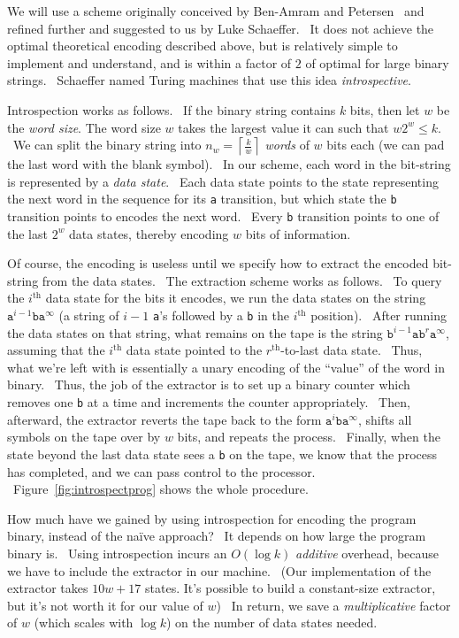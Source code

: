 \documentclass[11pt]{article}
\begin{document}
We will use a scheme originally conceived by Ben-Amram and Petersen~\cite{benamram} and refined further and suggested to us by Luke Schaeffer. \ It does not achieve the optimal theoretical encoding described above, but is relatively simple to implement and understand, and is within a factor of $2$ of optimal for large binary strings. \ Schaeffer named Turing machines that use this idea \emph{introspective}.

Introspection works as follows. \ If the binary string contains $k$ bits, then let $w$ be the \emph{word size}. The word size $w$ takes the largest value it can such that $w2^w \le k$. \ We can split the binary string into $n_w = \left \lceil{\frac{k}{w}}\right \rceil$ \emph{words} of $w$ bits each (we can pad the last word with the blank symbol). \ In our scheme, each word in the bit-string is represented by a \emph{data state}. \ Each data state points to the state representing the next word in the sequence for its \texttt{a} transition, but which state the \texttt{b} transition points to encodes the next word. \ Every \texttt{b} transition points to one of the last $2^w$ data states, thereby encoding $w$ bits of information.

Of course, the encoding is useless until we specify how to extract the encoded bit-string from the data states. \ The extraction scheme works as follows. \ To query the $i^\textrm{th}$ data state for the bits it encodes, we run the data states on the string $\texttt{a}^{i-1}\texttt{b}\texttt{a}^{\infty}$ (a string of $i-1$ \texttt{a}'s followed by a \texttt{b} in the $i^\textrm{th}$ position). \ After running the data states on that string, what remains on the tape is the string $\texttt{b}^{i-1}\texttt{a}\texttt{b}^r\texttt{a}^{\infty}$, assuming that the $i^\textrm{th}$ data state pointed to the $r^\textrm{th}$-to-last data state. \ Thus, what we're left with is essentially a unary encoding of the ``value'' of the word in binary. \ Thus, the job of the extractor is to set up a binary counter which removes one \texttt{b} at a time and increments the counter appropriately. \ Then, afterward, the extractor reverts the tape back to the form $\texttt{a}^i\texttt{b}\texttt{a}^{\infty}$, shifts all symbols on the tape over by $w$ bits, and repeats the process. \ Finally, when the state beyond the last data state sees a \texttt{b} on the tape, we know that the process has completed, and we can pass control to the processor. \ Figure~\ref{fig:introspectprog} shows the whole procedure.

How much have we gained by using introspection for encoding the program binary, instead of the na\"ive approach? \ It depends on how large the program binary is. \ Using introspection incurs an $O(\log k)$ \emph{additive} overhead, because we have to include the extractor in our machine. \ (Our implementation of the extractor takes $10w + 17$ states. It's possible to build a constant-size extractor, but it's not worth it for our value of $w$) \ In return, we save a \emph{multiplicative} factor of $w$ (which scales with $\log k$) on the number of data states needed.
\end{document}
